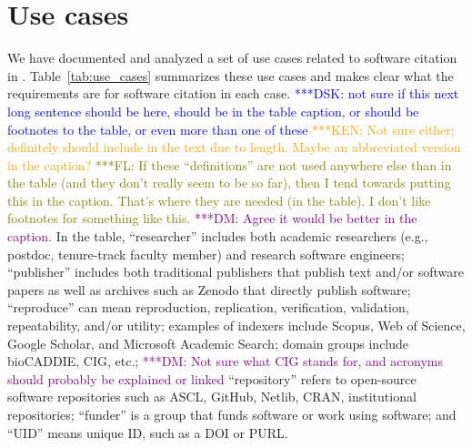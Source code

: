 \documentclass[11pt, oneside]{amsart}
\newcommand{\katznote}[1]{ {\textcolor{blue} { ***DSK: #1 }}}
\newcommand{\niemnote}[1]{ {\textcolor{orange} { ***KEN: #1 }}}
\newcommand{\flnote}[1]{ {\textcolor{olive} { ***FL: #1 }}}
\newcommand{\dmnote}[1]{ {\textcolor{purple} { ***DM: #1 }}} %
\begin{document}
\section{Use cases}
\label{sec:use_cases}

We have documented and analyzed a set of use cases related to software citation in \cite{SC-Use-Cases}.
Table~\ref{tab:use_cases} summarizes these use cases and makes clear what the requirements are for software citation in each case.
\katznote{not sure if this next long sentence should be here, should be in the table caption, or should be footnotes to the table, or even more than one of these}
\niemnote{Not sure either; definitely should include in the text due to length. Maybe an abbreviated version in the caption?}\flnote{If these ``definitions'' are not used anywhere else than in the table (and they don't really seem to be so far), then I tend towards putting this in the caption. That's where they are needed (in the table). I don't like footnotes for something like this.}\dmnote{Agree it would be better in the caption.}
In the table,
``researcher'' includes both academic researchers (e.g., postdoc, tenure-track faculty member) and research software engineers;
``publisher'' includes both traditional publishers that publish text and\slash or software papers as well as archives such as Zenodo that directly publish software;
``reproduce'' can mean reproduction, replication, verification, validation, repeatability, and\slash or utility;
examples of indexers include Scopus, Web of Science, Google Scholar, and Microsoft Academic Search;
domain groups include bioCADDIE, CIG, etc.;\dmnote{Not sure what CIG stands for, and acronyms should probably be explained or linked}
``repository'' refers to open-source software repositories such as ASCL, GitHub, Netlib, CRAN, institutional repositories;
``funder'' is a group that funds software or work using software; and
``UID'' means unique ID, such as a DOI or PURL.
\end{document}
